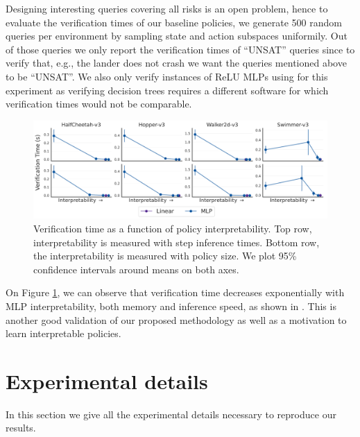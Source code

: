 Designing interesting queries covering all risks is an open problem, hence to evaluate the verification times of our baseline policies, we generate 500 random queries per environment by sampling state and action subspaces uniformily. Out of those queries we only report the verification times of ``UNSAT'' queries since to verify that, e.g., the lander does not crash we want the queries mentioned above to be ``UNSAT''. We also only verify instances of ReLU MLPs using \cite{maraboupy} for this experiment as verifying decision trees requires a different software \cite{z3} for which verification times would not be comparable.
\begin{figure}[ht]
    \centering
    \includegraphics[width=1\linewidth]{images/images_part3/verification_tradeoff.pdf}
    \caption{Verification time as a function of policy interpretability. Top row, interpretability is measured with step inference times. Bottom row, the interpretability is measured with policy size. We plot 95\% confidence intervals around means on both axes.}
    \label{fig:trade-off-verif}
\end{figure}

On Figure \ref{fig:trade-off-verif}, we can observe that verification time decreases exponentially with MLP interpretability, both memory and inference speed, as shown in \cite{lens-complexity}. This is another good validation of our proposed methodology as well as a motivation to learn interpretable policies. 

\section{Experimental details}

In this section we give all the experimental details necessary to reproduce our results.



